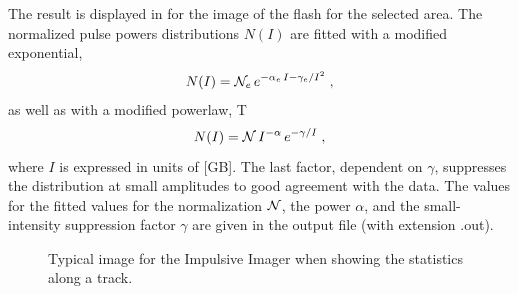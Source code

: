 The result is displayed in  for the image of the flash for the selected area. The normalized pulse powers distributions $N(I)$ are fitted with a modified exponential,
\begin{equation}
N(I)= {\cal N}_e \,e^{-\alpha_e\,I-\gamma_e/I^2}\;, \eqlab{PowLaw}
\end{equation}
as well as with a modified powerlaw,
T\begin{equation}
N(I)= {\cal N} \,I^{-\alpha}  \,e^{-\gamma/I}\;, \eqlab{PowLaw}
\end{equation}
where $I$ is expressed in units of [GB]. The last factor, dependent on $\gamma$, suppresses the distribution at small amplitudes to good agreement with the data. The values for the fitted values for the normalization ${\cal N}$, the power $\alpha$, and the small-intensity suppression factor $\gamma$ are given in the output file (with extension .out).

\begin{figure}[th]
	\caption{Typical image for the Impulsive Imager when showing the statistics along a track.}	 
\end{figure}

